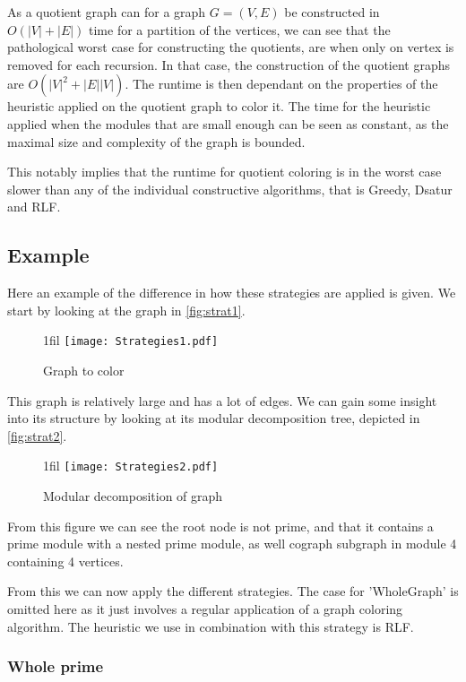 \documentclass[a4paper]{article}
\makeatletter
\newcommand*{\centerfloat}{%
  \parindent \z@
  \leftskip \z@ \@plus 1fil \@minus \textwidth
  \rightskip\leftskip
  \parfillskip \z@skip}
\makeatother
\begin{document}
As a quotient graph can for a graph $G = (V,E)$ be constructed in
$O(|V|+|E|)$ time for a partition of the vertices, we can see that the pathological
worst case for constructing the quotients, are when only on vertex is removed
for each recursion. In that case, the construction of the quotient graphs are
$O(|V|^2+|E||V|)$. The runtime is then dependant on the properties of the
heuristic applied on the quotient graph to color it. The time for the heuristic
applied when the modules that are small enough can be seen as constant, as the
maximal size and complexity of the graph is bounded. 

This notably implies that the runtime for quotient coloring is in the worst 
case slower than any of the individual constructive algorithms, that is 
Greedy, Dsatur and RLF.


\subsection{Example}
\label{sec:stratexample}
Here an example of the difference in how these strategies are applied is given.
We start by looking at the graph in \autoref{fig:strat1}.

\begin{figure}[H]
    \centerfloat
    \texttt{[image: Strategies1.pdf]}
    \caption{Graph to color}
    \label{fig:strat1}
\end{figure}

This graph is relatively large and has a lot of edges. 
We can gain some insight into its structure by looking at its modular decomposition tree,
depicted in \autoref{fig:strat2}.

\begin{figure}[H]
    \centerfloat
    \texttt{[image: Strategies2.pdf]}
    \caption{Modular decomposition of graph}
    \label{fig:strat2}
\end{figure}

From this figure we can see the root node is not prime, and that it contains a
prime module with a nested prime module, as well cograph
subgraph in module 4 containing 4 vertices.

From this we can now apply the different strategies. The case for 'WholeGraph'
is omitted here as it just involves a regular application of a graph coloring
algorithm. The heuristic we use in combination with this strategy is RLF. 

\subsubsection{Whole prime}
\end{document}
